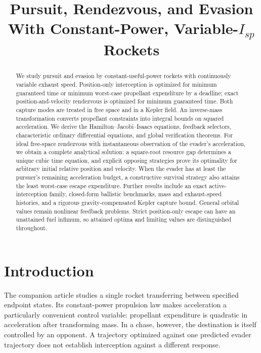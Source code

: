 \documentclass[journal,a4paper]{IEEEtran}
\date{}
\begin{document}
\title{Pursuit, Rendezvous, and Evasion With Constant-Power, Variable-$I_{\!sp}$ Rockets}
\maketitle

\begin{abstract}
We study pursuit and evasion by constant-useful-power rockets with continuously variable exhaust speed. Position-only interception is optimized for minimum guaranteed time or minimum worst-case propellant expenditure by a deadline; exact position-and-velocity rendezvous is optimized for minimum guaranteed time. Both capture modes are treated in free space and in a Kepler field. An inverse-mass transformation converts propellant constraints into integral bounds on squared acceleration. We derive the Hamilton--Jacobi--Isaacs equations, feedback selectors, characteristic ordinary differential equations, and global verification theorems. For ideal free-space rendezvous with instantaneous observation of the evader's acceleration, we obtain a complete analytical solution: a square-root resource gap determines a unique cubic time equation, and explicit opposing strategies prove its optimality for arbitrary initial relative position and velocity. When the evader has at least the pursuer's remaining acceleration budget, a constructive survival strategy also attains the least worst-case escape expenditure. Further results include an exact active-interception family, closed-form ballistic benchmarks, mass and exhaust-speed histories, and a rigorous gravity-compensated Kepler capture bound. General orbital values remain nonlinear feedback problems. Strict position-only escape can have an unattained fuel infimum, so attained optima and limiting values are distinguished throughout.
\end{abstract}

\section{Introduction}
The companion article \cite{OlsinaCompanion} studies a single rocket transferring between specified endpoint states. Its constant-power propulsion law makes acceleration a particularly convenient control variable: propellant expenditure is quadratic in acceleration after transforming mass. In a chase, however, the destination is itself controlled by an opponent. A trajectory optimized against one predicted evader trajectory does not establish interception against a different response.
\end{document}
